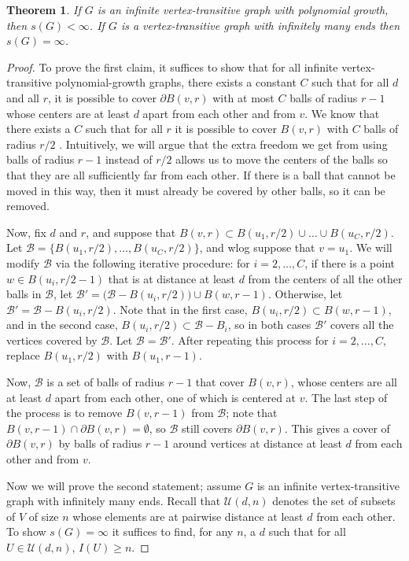 \documentclass[11pt]{article}
\newtheorem{thm}{Theorem}
\newcommand{\U}{\mathcal{U}}
\newcommand{\B}{\mathcal{B}}
\begin{document}
\begin{thm}\label{poly_ends} If $G$ is an infinite vertex-transitive graph with polynomial growth, then $s(G)< \infty$. If $G$ is a vertex-transitive graph with infinitely many ends then $s(G) = \infty$. \end{thm}

\begin{proof} To prove the first claim, it suffices to show that for all infinite vertex-transitive polynomial-growth graphs, there exists a constant $C$ such that for all $d$ and all $r$, it is possible to cover $\partial B(v,r)$ with at most $C$ balls of radius $r-1$ whose centers are at least $d$ apart from each other and from $v$. We know that there exists a $C$ such that for all $r$ it is possible to cover $B(v,r)$ with $C$ balls of radius $r/2$ \cite{doubling}. Intuitively, we will argue that the extra freedom we get from using balls of radius $r-1$ instead of $r/2$ allows us to move the centers of the balls so that they are all sufficiently far from each other. If there is a ball that cannot be moved in this way, then it must already be covered by other balls, so it can be removed.

Now, fix $d$ and $r$, and suppose that $B(v,r) \subset B(u_1, r/2) \cup \ldots \cup B(u_C,r/2)$. Let $\B = \{B(u_1,r/2), \ldots , B(u_C,r/2)\}$, and wlog suppose that $v  = u_1$. We will modify $\B$ via the following iterative procedure: for $i = 2, \ldots, C$, if there is a point $w \in B(u_i, r/2-1)$ that is at distance at least $d$ from the centers of all the other balls in $\B$, let $\B' = \bigl(\B - B(u_i,r/2)\bigr) \cup B(w, r-1)$. Otherwise, let $\B' = \B - B(u_i, r/2)$. Note that in the first case, $B(u_i, r/2) \subset B(w, r-1)$, and in the second case, $B(u_i, r/2) \subset \B - B_i$, so in both cases $\B'$ covers all the vertices covered by $\B$. Let $\B = \B'$. After repeating this process for $i = 2, \ldots , C$, replace $B(u_1,r/2)$ with $B(u_1, r-1)$.

Now, $\B$ is a set of balls of radius $r-1$ that cover $B(v,r)$, whose centers are all at least $d$ apart from each other, one of which is centered at $v$. The last step of the process is to remove $B(v,r-1)$ from $\B$; note that $B(v, r-1) \cap \partial B(v,r) = \emptyset$, so $\B$ still covers $\partial B(v,r)$. This gives a cover of $\partial B(v,r)$ by balls of radius $r-1$ around vertices at distance at least $d$ from each other and from $v$.

Now we will prove the second statement; assume $G$ is an infinite vertex-transitive graph with infinitely many ends.
Recall that $\U(d,n)$ denotes the set of subsets of $V$ of size $n$ whose elements are at pairwise distance at least $d$ from each other. To show $s(G) = \infty$ it suffices to find, for any $n$, a $d$ such that for all $U \in \U(d,n)$, $I(U) \geq n$. 


\end{proof}
\end{document}
